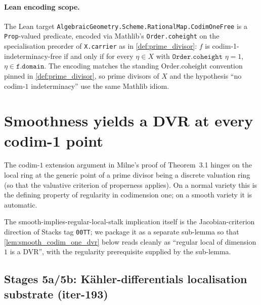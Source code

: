 \begin{definition}
  \paragraph{Lean encoding scope.} The Lean target
  \texttt{AlgebraicGeometry.Scheme.RationalMap.CodimOneFree} is a \texttt{Prop}-valued
  predicate, encoded via Mathlib's \texttt{Order.coheight} on the specialisation
  preorder of \texttt{X.carrier} as in
  \cref{def:prime_divisor}: \(f\) is codim-1-indeterminacy-free if and only if for every
  \(\eta \in X\) with \(\texttt{Order.coheight\ }\eta = 1\), \(\eta \in
  \texttt{f.domain}\). The encoding matches the standing \(\mathrm{Order.coheight}\)
  convention pinned in \cref{def:prime_divisor}, so prime divisors of \(X\) and the
  hypothesis ``no codim-\(1\) indeterminacy'' use the same Mathlib idiom.
\end{definition}

\section{Smoothness yields a DVR at every codim-1 point}
\label{sec:smooth_dvr}

The codim-\(1\) extension argument in Milne's proof of Theorem~3.1 hinges on the local
ring at the generic point of a prime divisor being a discrete valuation ring (so that
the valuative criterion of properness applies). On a normal variety this is the
defining property of regularity in codimension one; on a smooth variety it is automatic.

The smooth-implies-regular-local-stalk implication itself is the Jacobian-criterion
direction of Stacks tag \texttt{00TT}; we package it as a separate sub-lemma so that
\cref{lem:smooth_codim_one_dvr} below reads cleanly as ``regular local of dimension
\(1\) is a DVR'', with the regularity prerequisite supplied by the sub-lemma.

\subsection{Stages 5a/5b: K\"ahler-differentials localisation substrate (iter-193)}
\label{subsec:kaehler_localisation_substrate}

